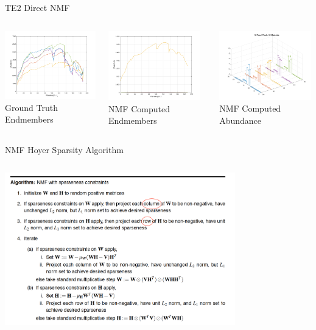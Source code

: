 \documentclass{beamer}
\begin{document}
\begin{frame}{TE2 Direct NMF}
\begin{columns}
    \begin{column}{0.33\textwidth}
        \includegraphics[width=4cm,center]{reflectance}
        \\ Ground Truth Endmembers
        \centering
    \end{column}
    \begin{column}{0.33\textwidth}
        \includegraphics[width=4cm,center]{other_te2_nmf_endmembers.png}
        \\ NMF Computed Endmembers
        \centering
    \end{column}
    \begin{column}{0.33\textwidth}
        \includegraphics[width=4cm,center]{other_te2_nmf_allmaterials.png}
        \\ NMF Computed Abundance
        \centering
    \end{column}
\end{columns}
\end{frame}

\begin{frame}{NMF Hoyer Sparsity Algorithm}
    \begin{columns}
        \begin{column}{1\textwidth}
            \includegraphics[width=10cm,left]{hoyer.png}
        \end{column}
    \end{columns}
\end{frame}
\end{document}
